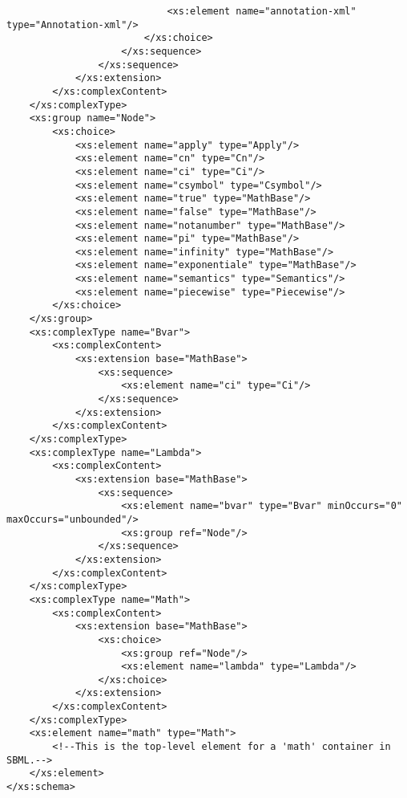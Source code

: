 \begin{footnotesize}
\begin{verbatim}
                            <xs:element name="annotation-xml" type="Annotation-xml"/>
                        </xs:choice>
                    </xs:sequence>
                </xs:sequence>
            </xs:extension>
        </xs:complexContent>
    </xs:complexType>
    <xs:group name="Node">
        <xs:choice>
            <xs:element name="apply" type="Apply"/>
            <xs:element name="cn" type="Cn"/>
            <xs:element name="ci" type="Ci"/>
            <xs:element name="csymbol" type="Csymbol"/>
            <xs:element name="true" type="MathBase"/>
            <xs:element name="false" type="MathBase"/>
            <xs:element name="notanumber" type="MathBase"/>
            <xs:element name="pi" type="MathBase"/>
            <xs:element name="infinity" type="MathBase"/>
            <xs:element name="exponentiale" type="MathBase"/>
            <xs:element name="semantics" type="Semantics"/>
            <xs:element name="piecewise" type="Piecewise"/>
        </xs:choice>
    </xs:group>
    <xs:complexType name="Bvar">
        <xs:complexContent>
            <xs:extension base="MathBase">
                <xs:sequence>
                    <xs:element name="ci" type="Ci"/>
                </xs:sequence>
            </xs:extension>
        </xs:complexContent>
    </xs:complexType>
    <xs:complexType name="Lambda">
        <xs:complexContent>
            <xs:extension base="MathBase">
                <xs:sequence>
                    <xs:element name="bvar" type="Bvar" minOccurs="0" maxOccurs="unbounded"/>
                    <xs:group ref="Node"/>
                </xs:sequence>
            </xs:extension>
        </xs:complexContent>
    </xs:complexType>
    <xs:complexType name="Math">
        <xs:complexContent>
            <xs:extension base="MathBase">
                <xs:choice>
                    <xs:group ref="Node"/>
                    <xs:element name="lambda" type="Lambda"/>
                </xs:choice>
            </xs:extension>
        </xs:complexContent>
    </xs:complexType>
    <xs:element name="math" type="Math">
        <!--This is the top-level element for a 'math' container in SBML.-->
    </xs:element>
</xs:schema>
\end{verbatim}
\regularspacing
\end{footnotesize}
